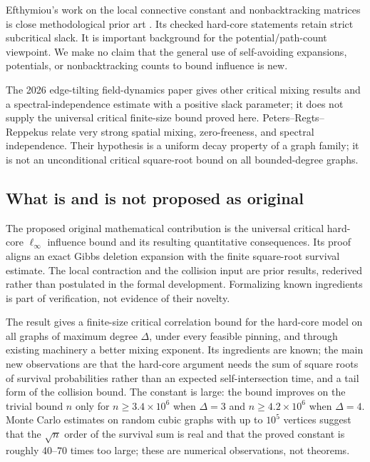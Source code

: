\documentclass[11pt]{article}
\theoremstyle{definition}
\begin{document}
Efthymiou's work on the local connective constant and nonbacktracking
matrices is close methodological prior art \cite{Efthymiou}. Its checked
hard-core statements retain strict subcritical slack. It is important
background for the potential/path-count viewpoint. We make no claim that
the general use of self-avoiding expansions, potentials, or nonbacktracking
counts to bound influence is new.

The 2026 edge-tilting field-dynamics paper \cite{EdgeTilting} gives other
critical mixing results and a spectral-independence estimate with a positive
slack parameter; it does not supply the universal critical finite-size bound
proved here. Peters--Regts--Reppekus \cite{PRR} relate very strong spatial
mixing, zero-freeness, and spectral independence. Their hypothesis is a
uniform decay property of a graph family; it is not an unconditional
critical square-root bound on all bounded-degree graphs.

\subsection{What is and is not proposed as original}

The proposed original mathematical contribution is the universal critical
hard-core $\ell_\infty$ influence bound and its resulting quantitative
consequences. Its proof aligns an exact Gibbs deletion expansion with the
finite square-root survival estimate. The local contraction and the
collision input are prior results, rederived rather than postulated in the
formal development. Formalizing known ingredients is part of verification,
not evidence of their novelty.

The result gives a finite-size critical correlation bound for the
hard-core model on all graphs of maximum degree $\Delta$, under every
feasible pinning, and through existing machinery a better mixing exponent.
Its ingredients are known; the main new observations are that the hard-core
argument needs the sum of square roots of survival probabilities rather than
an expected self-intersection time, and a tail form of the collision bound.
The constant is large: the bound improves on the trivial bound $n$ only for
$n\ge3.4\times10^{6}$ when $\Delta=3$ and $n\ge4.2\times10^{6}$ when
$\Delta=4$. Monte Carlo estimates on random cubic graphs with up to $10^5$
vertices suggest that the $\sqrt n$ order of the survival sum is real and that
the proved constant is roughly 40--70 times too large; these are numerical
observations, not theorems.
\end{document}
